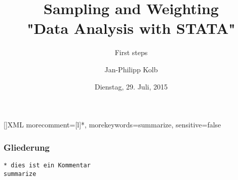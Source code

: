\documentclass{beamer}
\newcommand{\R}[1]{{\tt \color{blue}  #1}}
\begin{document}
\title{Sampling and Weighting \\ "Data Analysis with STATA"}  
\subtitle{First steps}

\author{Jan-Philipp Kolb}
\date{Dienstag, 29. Juli, 2015} 

%
%



[]{XML}{
        morecomment=[l]{*},  
        morekeywords={summarize},
        sensitive=false
}

%
%


\begin{titlepage} %



\thispagestyle{empty} %
\end{titlepage}

%
%


\begin{frame}[fragile]
\frametitle{Gliederung}\tableofcontents

\begin{lstlisting}
* dies ist ein Kommentar
summarize
\end{lstlisting}
\end{frame} 
\end{document}
